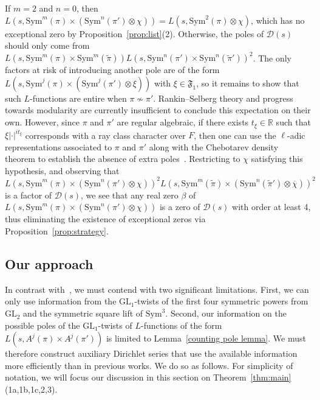 \documentclass[11pt]{amsart}
\theoremstyle{remark}
\newcommand{\Sym}{\mathrm{Sym}}
\newcommand{\GL}{\mathrm{GL}}
\numberwithin{equation}{section}
\begin{document}
If $m=2$ and $n=0$, then $L(s,\mathrm{Sym}^{m}(\pi)\times(\mathrm{Sym}^n(\pi')\otimes\chi)) = L(s,\Sym^2(\pi)\otimes\chi)$, which has no exceptional zero by Proposition~\ref{prop:list}(2).  Otherwise, the poles of $\mathcal{D}(s)$ should only come from $L(s,\mathrm{Sym}^{m}(\pi)\times\mathrm{Sym}^m(\widetilde{\pi})) L(s,\mathrm{Sym}^{n}(\pi')\times\mathrm{Sym}^n(\widetilde{\pi}'))^2$.  The only factors at risk of introducing another pole are of the form $L(s,\Sym^j(\pi)\times(\Sym^j(\pi')\otimes\xi))$ with $\xi\in\mathfrak{F}_1$, so it remains to show that such $L$-functions are entire when $\pi\not\sim\pi'$.  Rankin--Selberg theory and progress towards modularity are currently insufficient to conclude this expectation on their own.  However, since $\pi$ and $\pi'$ are regular algebraic, if there exists $t_{\xi}\in\mathbb{R}$ such that $\xi|\cdot|^{it_{\xi}}$ corresponds with a ray class character over $F$, then one can use the $\ell$-adic representations associated to $\pi$ and $\pi'$ along with the Chebotarev density theorem to establish the absence of extra poles~\cite[Lemma~4.2]{Thorner_Siegel}.  Restricting to $\chi$ satisfying this hypothesis, and observing that
\[
L(s,\mathrm{Sym}^{m}(\pi)\times(\mathrm{Sym}^{n}(\pi')\otimes\chi))^2 L(s,\mathrm{Sym}^m(\widetilde{\pi})\times(\mathrm{Sym}^n(\widetilde{\pi}')\otimes\overline{\chi}))^2
\]
is a factor of $\mathcal{D}(s)$, we see that any real zero $\beta$ of $L(s,\mathrm{Sym}^{m}(\pi)\times(\mathrm{Sym}^{n}(\pi')\otimes\chi))$ is a zero of $\mathcal{D}(s)$ with order at least 4, thus eliminating the existence of exceptional zeros via Proposition~\ref{prop:strategy}.

\subsection{Our approach}
\label{subsec:OurApproach}

In contrast with~\cite{Thorner_Siegel}, we must contend with two significant limitations.  First, we can only use information from the $\GL_1$-twists of the first four symmetric powers from $\GL_2$ and the symmetric square lift of $\Sym^3$.  Second, our information on the possible poles of the $\GL_1$-twists of $L$-functions of the form $L(s,A^j(\pi)\times A^j(\pi'))$ is limited to Lemma~\ref{counting pole lemma}.  We must therefore construct auxiliary Dirichlet series that use the available information more efficiently than in previous works.  We do so as follows.  For simplicity of notation, we will focus our discussion in this section on Theorem~\ref{thm:main}(1a,1b,1c,2,3).
\end{document}
